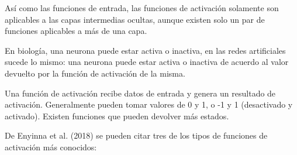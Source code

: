 \documentclass[a4paper,12pt,oneside,spanish]{book}
\begin{document}
Así como las funciones de entrada, las funciones de activación solamente son aplicables a las capas intermedias ocultas, aunque existen solo un par de funciones aplicables a más de una capa.\par

En biología, una neurona puede estar activa o inactiva, en las redes artificiales sucede lo mismo: una neurona puede estar activa o inactiva de acuerdo al valor devuelto por la función de activación de la misma.\par

Una función de activación recibe datos de entrada y genera un resultado de activación. Generalmente pueden tomar valores de 0 y 1, o -1 y 1 (desactivado y activado). Existen funciones que pueden devolver más estados.\par

De Enyinna et al. (2018) se pueden citar tres de los tipos de funciones de activación más conocidos:
\end{document}
